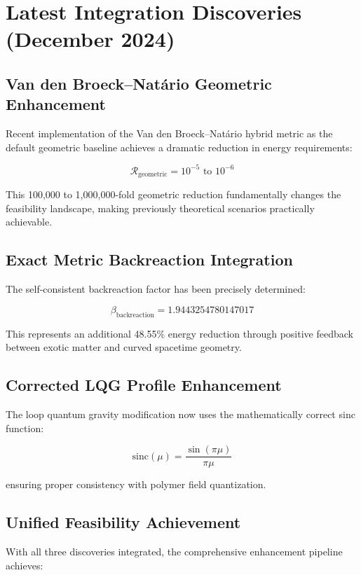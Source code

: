 \documentclass{article}
\begin{document}
\section{Latest Integration Discoveries (December 2024)}

\subsection{Van den Broeck–Natário Geometric Enhancement}
Recent implementation of the Van den Broeck–Natário hybrid metric as the default geometric baseline achieves a dramatic reduction in energy requirements:

\begin{equation}
\mathcal{R}_{\text{geometric}} = 10^{-5} \text{ to } 10^{-6}
\end{equation}

This 100,000 to 1,000,000-fold geometric reduction fundamentally changes the feasibility landscape, making previously theoretical scenarios practically achievable.

\subsection{Exact Metric Backreaction Integration}
The self-consistent backreaction factor has been precisely determined:

\begin{equation}
\beta_{\text{backreaction}} = 1.9443254780147017
\end{equation}

This represents an additional 48.55\% energy reduction through positive feedback between exotic matter and curved spacetime geometry.

\subsection{Corrected LQG Profile Enhancement}
The loop quantum gravity modification now uses the mathematically correct sinc function:

\begin{equation}
\text{sinc}(\mu) = \frac{\sin(\pi\mu)}{\pi\mu}
\end{equation}

ensuring proper consistency with polymer field quantization.

\subsection{Unified Feasibility Achievement}
With all three discoveries integrated, the comprehensive enhancement pipeline achieves:
\end{document}
